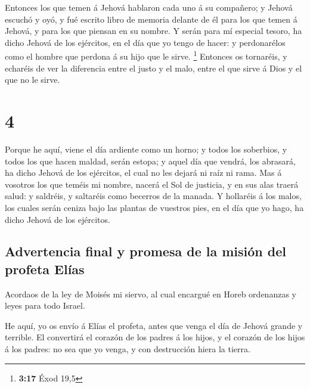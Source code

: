 Entonces los que temen á Jehová hablaron cada uno á su
compañero; y Jehová escuchó y oyó, y fué escrito libro de memoria
delante de él para los que temen á Jehová, y para los que piensan en su
nombre.  Y serán para mí especial tesoro, ha dicho Jehová
de los ejércitos, en el día que yo tengo de hacer: y perdonarélos como
el hombre que perdona á su hijo que le sirve. \footnote{\textbf{3:17}
  Éxod 19,5}  Entonces os tornaréis, y echaréis de ver la
diferencia entre el justo y el malo, entre el que sirve á Dios y el que
no le sirve.

\hypertarget{section-3}{%
\section{4}\label{section-3}}

 Porque he aquí, viene el día ardiente como un horno; y
todos los soberbios, y todos los que hacen maldad, serán estopa; y aquel
día que vendrá, los abrasará, ha dicho Jehová de los ejércitos, el cual
no les dejará ni raíz ni rama.  Mas á vosotros los que
teméis mi nombre, nacerá el Sol de justicia, y en sus alas traerá salud:
y saldréis, y saltaréis como becerros de la manada.  Y
hollaréis á los malos, los cuales serán ceniza bajo las plantas de
vuestros pies, en el día que yo hago, ha dicho Jehová de los ejércitos.

\hypertarget{advertencia-final-y-promesa-de-la-misiuxf3n-del-profeta-eluxedas}{%
\subsection{Advertencia final y promesa de la misión del profeta
Elías}\label{advertencia-final-y-promesa-de-la-misiuxf3n-del-profeta-eluxedas}}

 Acordaos de la ley de Moisés mi siervo, al cual encargué
en Horeb ordenanzas y leyes para todo Israel.

 He aquí, yo os envío á Elías el profeta, antes que venga
el día de Jehová grande y terrible.  El convertirá el
corazón de los padres á los hijos, y el corazón de los hijos á los
padres: no sea que yo venga, y con destrucción hiera la tierra.
